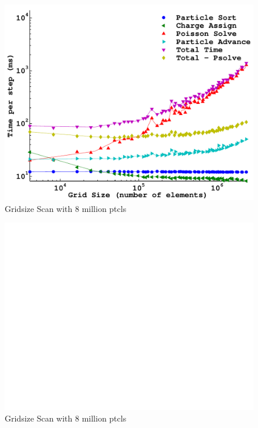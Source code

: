 \begin{figure}
\begin{center}
\includegraphics[width=6in]{performance/gridsize_scan8ptcls8bins.pdf}
\end{center}
\caption{Gridsize Scan with 8 million ptcls}
\label{fig:nptclsize_scan128x64x64}
\end{figure}


\begin{figure}
\begin{center}
\includegraphics[width=6in]{performance/gridsize_scan8ptcls16bins.pdf}
\end{center}
\caption{Gridsize Scan with 8 million ptcls}
\label{fig:nptclsize_scan128x64x64}
\end{figure}


